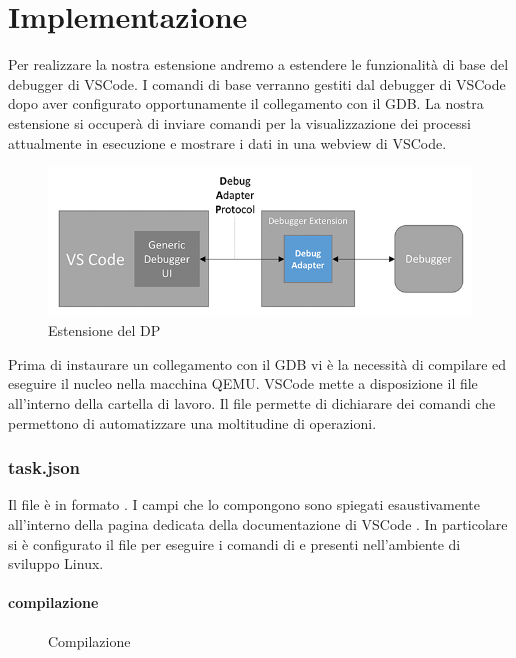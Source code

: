 \chapter{Implementazione}
Per realizzare la nostra estensione andremo a estendere le funzionalità di base del debugger di VSCode. I comandi di base verranno gestiti dal debugger di VSCode dopo aver configurato opportunamente il collegamento con il GDB. La nostra estensione 
si occuperà di inviare comandi per la visualizzazione dei processi attualmente in esecuzione e mostrare i dati in una webview di VSCode.

\begin{figure}[H]
    \centering
    \includegraphics[width=0.7\columnwidth]{images/debug-arch2.png}
    \caption{Estensione del DP}
    \label{fig:dap dp and extension}
\end{figure}

Prima di instaurare un collegamento con il GDB vi è la necessità di compilare ed eseguire il nucleo nella macchina QEMU. VSCode mette a disposizione il file  all'interno della cartella di lavoro. Il file permette di dichiarare dei comandi che permettono di automatizzare una moltitudine di operazioni.
\subsection*{task.json}
Il file  è in formato . I campi che lo compongono sono spiegati esaustivamente all'interno della pagina dedicata della documentazione di VSCode \cite{VSCodeTasks}. In particolare si è configurato il file per eseguire i comandi di  e  presenti nell'ambiente di sviluppo Linux.  

\subsubsection*{compilazione}   

\begin{figure}[H]
    
    \caption{Compilazione}
\end{figure}

